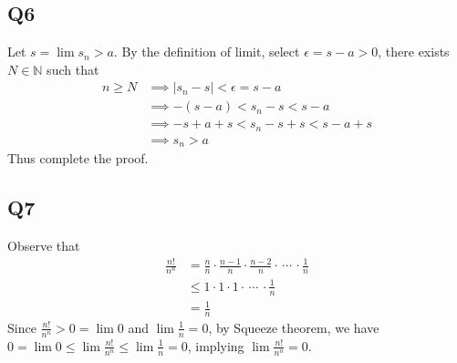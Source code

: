 \documentclass[12pt,lettersize]{article}
\newcommand{\N}{\mathbb{N}}
\begin{document}
\newpage

\subsection*{Q6}
Let $s=\lim s_n>a$. By the definition of limit, select $\epsilon=s-a>0$, there exists $N\in\N$ such that
\begin{align*}
	n\geq N &\implies |s_n-s|<\epsilon=s-a\\
			&\implies -(s-a)<s_n-s<s-a\\
			&\implies -s+a+s<s_n-s+s<s-a+s\\
			&\implies s_n>a
\end{align*}
Thus complete the proof.

\newpage

\subsection*{Q7}
Observe that
\begin{align*}
	\frac{n!}{n^n} &= \frac{n}{n}\cdot\frac{n-1}{n}\cdot\frac{n-2}{n}\cdot\,\cdots\,\cdot\frac{1}{n}\\
				   &\leq 1\cdot1\cdot1\cdot\,\cdots\,\cdot\frac{1}{n}\\
				   &= \frac{1}{n}
\end{align*}
Since $\frac{n!}{n^n}>0=\lim0$ and $\lim\frac{1}{n}=0$, by Squeeze theorem, we have $0=\lim 0\leq\lim\frac{n!}{n^n}\leq\lim\frac{1}{n}=0$, implying $\lim\frac{n!}{n^n}=0$.
\newpage
\end{document}
